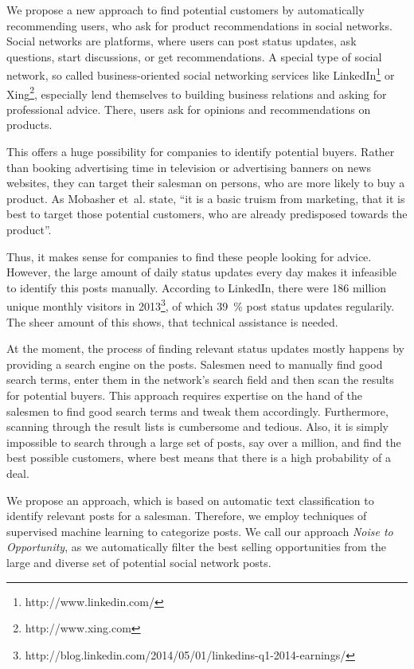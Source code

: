 We propose a new approach to find potential customers by automatically recommending users, who ask for product recommendations in social networks.
Social networks are platforms, where users can post status updates, ask questions, start discussions, or get recommendations.
A special type of social network, so called business-oriented social networking services like LinkedIn\footnote{http://www.linkedin.com/} or Xing\footnote{http://www.xing.com}, especially lend themselves to building business relations and asking for professional advice.
There, users ask for opinions and recommendations on products.

This offers a huge possibility for companies to identify potential buyers.
Rather than booking advertising time in television or advertising banners on news websites, they can target their salesman on persons, who are more likely to buy a product.
As Mobasher et~al. \cite{mobasher2007toward} state, ``it is a basic truism from marketing, that it is best to target those potential customers, who are already predisposed towards the product''.

Thus, it makes sense for companies to find these people looking for advice.
However, the large amount of daily status updates every day makes it infeasible to identify this posts manually.
According to LinkedIn, there were 186 million unique monthly visitors in 2013\footnote{http://blog.linkedin.com/2014/05/01/linkedins-q1-2014-earnings/}, of which 39~\% post status updates regularily.
The sheer amount of this shows, that technical assistance is needed.

At the moment, the process of finding relevant status updates mostly happens by providing a search engine on the posts.
Salesmen need to manually find good search terms, enter them in the network's search field and then scan the results for potential buyers.
This approach requires expertise on the hand of the salesmen to find good search terms and tweak them accordingly.
Furthermore, scanning through the result lists is cumbersome and tedious.
Also, it is simply impossible to search through a large set of posts, say over a million, and find the best possible customers, where best means that there is a high probability of a deal.

We propose an approach, which is based on automatic text classification to identify relevant posts for a salesman.
Therefore, we employ techniques of supervised machine learning to categorize posts.
We call our approach \emph{Noise to Opportunity}, as we automatically filter the best selling opportunities from the large and diverse set of potential social network posts.

